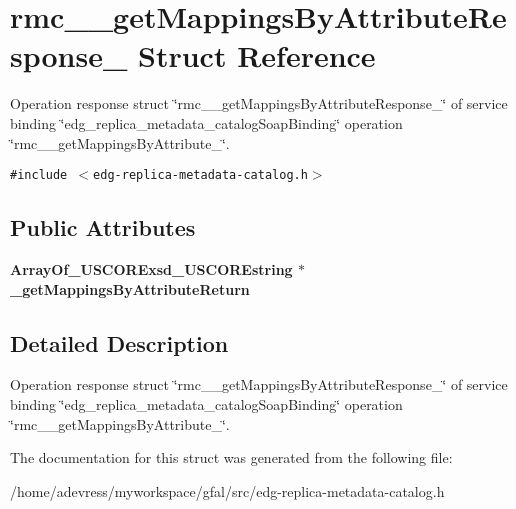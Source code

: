\section{rmc\_\-\_\-get\-Mappings\-By\-Attribute\-Response\_\- Struct Reference}
\label{structrmc____getMappingsByAttributeResponse__}
Operation response struct \char`\"{}rmc\_\-\_\-get\-Mappings\-By\-Attribute\-Response\_\-\char`\"{} of service binding \char`\"{}edg\_\-replica\_\-metadata\_\-catalog\-Soap\-Binding\char`\"{} operation \char`\"{}rmc\_\-\_\-get\-Mappings\-By\-Attribute\_\-\char`\"{}.  


{\tt \#include $<$edg-replica-metadata-catalog.h$>$}

\subsection*{Public Attributes}
\begin{CompactItemize}
\item 
\bf{Array\-Of\_\-USCORExsd\_\-USCOREstring} $\ast$ \textbf{\_\-get\-Mappings\-By\-Attribute\-Return}\label{structrmc____getMappingsByAttributeResponse___d25dca6060440a4bd7f28e2069b996df}

\end{CompactItemize}


\subsection{Detailed Description}
Operation response struct \char`\"{}rmc\_\-\_\-get\-Mappings\-By\-Attribute\-Response\_\-\char`\"{} of service binding \char`\"{}edg\_\-replica\_\-metadata\_\-catalog\-Soap\-Binding\char`\"{} operation \char`\"{}rmc\_\-\_\-get\-Mappings\-By\-Attribute\_\-\char`\"{}. 



The documentation for this struct was generated from the following file:\begin{CompactItemize}
\item 
/home/adevress/myworkspace/gfal/src/edg-replica-metadata-catalog.h\end{CompactItemize}
